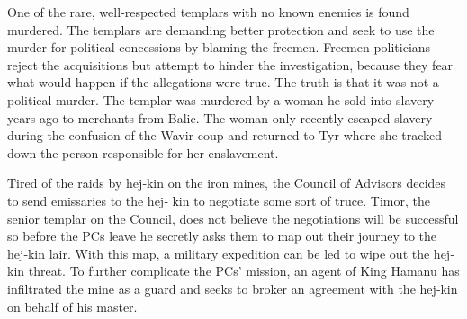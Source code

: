 {	\item One of the rare, well‐respected templars with no known enemies is found murdered. The templars are demanding better protection and seek to use the murder for political concessions by blaming the freemen. Freemen politicians reject the acquisitions but attempt to hinder the investigation, because they fear what would happen if the allegations were true. The truth is that it was not a political murder. The templar was murdered by a woman he sold into slavery years ago to merchants from Balic. The woman only recently escaped slavery during the confusion of the Wavir coup and returned to Tyr where she tracked down the person responsible for her enslavement.
	\item Tired of the raids by hej‐kin on the iron mines, the Council of Advisors decides to send emissaries to the hej‐ kin to negotiate some sort of truce. Timor, the senior templar on the Council, does not believe the negotiations will be successful so before the PCs leave he secretly asks them to map out their journey to the hej‐kin lair. With this map, a military expedition can be led to wipe out the hej‐ kin threat. To further complicate the PCs' mission, an agent of King Hamanu has infiltrated the mine as a guard and seeks to broker an agreement with the hej‐kin on behalf of his master.
}